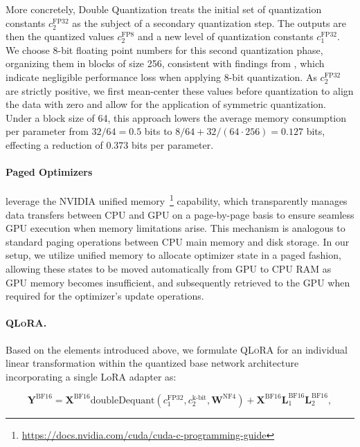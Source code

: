 More concretely, Double Quantization treats the initial set of quantization constants $c_2^{\text{FP32}}$ as the subject of a secondary quantization step. The outputs are then the quantized values $c_2^{\text{FP8}}$ and a new level of quantization constants $c_1^{\text{FP32}}$. We choose 8-bit floating point numbers for this second quantization phase, organizing them in blocks of size 256, consistent with findings from \citet{dettmers2022case}, which indicate negligible performance loss when applying 8-bit quantization. As $c_2^{\text{FP32}}$ are strictly positive, we first mean-center these values before quantization to align the data with zero and allow for the application of symmetric quantization. Under a block size of 64, this approach lowers the average memory consumption per parameter from $32/64=0.5$ bits to $8/64 + 32/(64\cdot256) = 0.127$ bits, effecting a reduction of 0.373 bits per parameter.

\paragraph{Paged Optimizers} leverage the NVIDIA unified memory~\footnote{\tiny \url{https://docs.nvidia.com/cuda/cuda-c-programming-guide}} capability, which transparently manages data transfers between CPU and GPU on a page-by-page basis to ensure seamless GPU execution when memory limitations arise. This mechanism is analogous to standard paging operations between CPU main memory and disk storage. In our setup, we utilize unified memory to allocate optimizer state in a paged fashion, allowing these states to be moved automatically from GPU to CPU RAM as GPU memory becomes insufficient, and subsequently retrieved to the GPU when required for the optimizer's update operations.

\paragraph{\textsc{QLoRA}.} Based on the elements introduced above, we formulate \textsc{QLoRA} for an individual linear transformation within the quantized base network architecture incorporating a single LoRA adapter as:

\begin{equation}
    \mathbf{Y}^{\text{BF16}} =  \mathbf{X}^{\text{BF16}} \text{doubleDequant}(c_1^{\text{FP32}}, c_2^{\text{k-bit}}, \mathbf{W}^{\text{NF4}}) + \mathbf{X}^{\text{BF16}}\mathbf{L}^{\text{BF16}}_1\mathbf{L}^{\text{BF16}}_2,
\end{equation}

